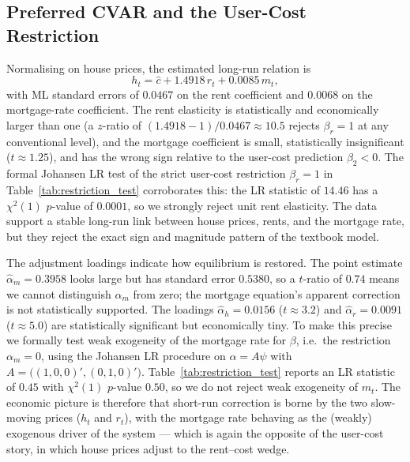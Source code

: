 \documentclass[12pt]{article}
\begin{document}


\subsection{Preferred CVAR and the User-Cost Restriction}

Normalising on house prices, the estimated long-run relation is
\begin{equation}
	h_t = \hat c + 1.4918\,r_t + 0.0085\,m_t,
\end{equation}
with ML standard errors of $0.0467$ on the rent coefficient and $0.0068$ on the mortgage-rate coefficient. The rent elasticity is statistically and economically larger than one (a $z$-ratio of $(1.4918-1)/0.0467 \approx 10.5$ rejects $\beta_r=1$ at any conventional level), and the mortgage coefficient is small, statistically insignificant ($t\approx 1.25$), and has the wrong sign relative to the user-cost prediction $\beta_2<0$. The formal Johansen LR test of the strict user-cost restriction $\beta_r=1$ in Table~\ref{tab:restriction_test} corroborates this: the LR statistic of $14.46$ has a $\chi^2(1)$ $p$-value of $0.0001$, so we strongly reject unit rent elasticity. The data support a stable long-run link between house prices, rents, and the mortgage rate, but they reject the exact sign and magnitude pattern of the textbook model.

The adjustment loadings indicate how equilibrium is restored. The point estimate $\hat\alpha_m=0.3958$ looks large but has standard error $0.5380$, so a $t$-ratio of $0.74$ means we cannot distinguish $\alpha_m$ from zero; the mortgage equation's apparent correction is not statistically supported. The loadings $\hat\alpha_h=0.0156$ ($t\approx 3.2$) and $\hat\alpha_r=0.0091$ ($t\approx 5.0$) are statistically significant but economically tiny. To make this precise we formally test weak exogeneity of the mortgage rate for $\beta$, i.e.\ the restriction $\alpha_m=0$, using the Johansen LR procedure on $\alpha = A\psi$ with $A=\bigl((1,0,0)',(0,1,0)'\bigr)$. Table~\ref{tab:restriction_test} reports an LR statistic of $0.45$ with $\chi^2(1)$ $p$-value $0.50$, so we do not reject weak exogeneity of $m_t$. The economic picture is therefore that short-run correction is borne by the two slow-moving prices ($h_t$ and $r_t$), with the mortgage rate behaving as the (weakly) exogenous driver of the system --- which is again the opposite of the user-cost story, in which house prices adjust to the rent--cost wedge.
\end{document}
